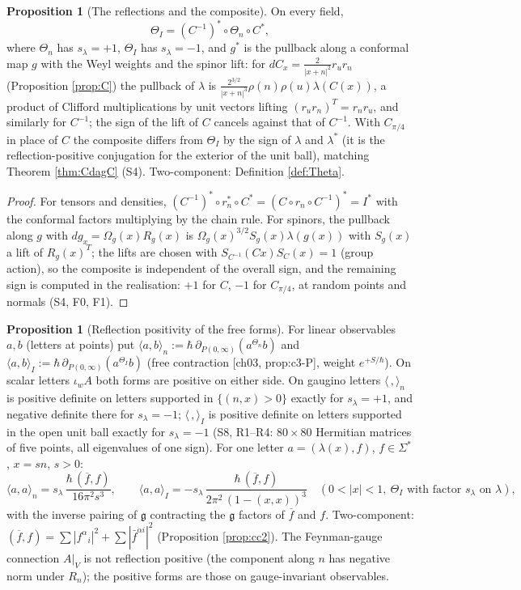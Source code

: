 \documentclass[11pt]{article}
\theoremstyle{definition}
\newtheorem{proposition}[definition]{Proposition}
\begin{document}
\begin{proposition}[The reflections and the composite]
\label{prop:composite}
On every field,
\[
\Theta_I=(C^{-1})^*\circ\Theta_n\circ C^*,
\]
where $\Theta_n$ has $s_\lambda=+1$, $\Theta_I$ has $s_\lambda=-1$, and $g^*$ is the pullback along a conformal map $g$ with the Weyl weights and the spinor lift: for $dC_x=\frac{2}{|x+n|^2}r_ur_n$ (Proposition \ref{prop:C}) the pullback of $\lambda$ is $\frac{2^{3/2}}{|x+n|^3}\rho(n)\rho(u)\lambda(C(x))$, a product of Clifford multiplications by unit vectors lifting $(r_ur_n)^T=r_nr_u$, and similarly for $C^{-1}$; the sign of the lift of $C$ cancels against that of $C^{-1}$. With $C_{\pi/4}$ in place of $C$ the composite differs from $\Theta_I$ by the sign of $\lambda$ and $\lambda^*$ (it is the reflection-positive conjugation for the exterior of the unit ball), matching Theorem \ref{thm:CdagC} (S4). Two-component: Definition \ref{def:Theta}.
\end{proposition}

\begin{proof}
For tensors and densities, $(C^{-1})^*\circ r_n^*\circ C^*=(C\circ r_n\circ C^{-1})^*=I^*$ with the conformal factors multiplying by the chain rule. For spinors, the pullback along $g$ with $dg_x=\Omega_g(x)R_g(x)$ is $\Omega_g(x)^{3/2}S_g(x)\lambda(g(x))$ with $S_g(x)$ a lift of $R_g(x)^T$; the lifts are chosen with $S_{C^{-1}}(Cx)S_C(x)=1$ (group action), so the composite is independent of the overall sign, and the remaining sign is computed in the realisation: $+1$ for $C$, $-1$ for $C_{\pi/4}$, at random points and normals (S4, F0, F1).
\end{proof}

\begin{proposition}[Reflection positivity of the free forms]
\label{prop:RP}
For linear observables $a,b$ (letters at points) put $\langle a,b\rangle_n:=\hbar\,\partial_{P(0,\infty)}(a^{\Theta_n}b)$ and $\langle a,b\rangle_I:=\hbar\,\partial_{P(0,\infty)}(a^{\Theta_I}b)$ (free contraction [ch03, prop:c3-P], weight $e^{+S/\hbar}$). On scalar letters $\iota_wA$ both forms are positive on either side. On gaugino letters $\langle\,,\rangle_n$ is positive definite on letters supported in $\{(n,x)>0\}$ exactly for $s_\lambda=+1$, and negative definite there for $s_\lambda=-1$; $\langle\,,\rangle_I$ is positive definite on letters supported in the open unit ball exactly for $s_\lambda=-1$ (S8, R1--R4: $80\times80$ Hermitian matrices of five points, all eigenvalues of one sign). For one letter $a=(\lambda(x),f)$, $f\in\Sigma^*$, $x=sn$, $s>0$:
\[
\langle a,a\rangle_n=s_\lambda\,\frac{\hbar\,(\overline f,f)}{16\pi^2s^3},\qquad
\langle a,a\rangle_I=-s_\lambda\,\frac{\hbar\,(\overline f,f)}{2\pi^2\,(1-(x,x))^{3}}\quad(0<|x|<1,\ \text{$\Theta_I$ with factor }s_\lambda\text{ on }\lambda),
\]
with the inverse pairing of $\mathfrak g$ contracting the $\mathfrak g$ factors of $\overline f$ and $f$. Two-component: $(\overline f,f)=\sum|f^\alpha{}_i|^2+\sum|\bar f^{\dot\alpha i}|^2$ (Proposition \ref{prop:cc2}). The Feynman-gauge connection $A|_V$ is not reflection positive (the component along $n$ has negative norm under $R_n$); the positive forms are those on gauge-invariant observables.
\end{proposition}
\end{document}
